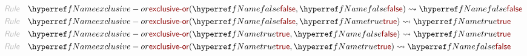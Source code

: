 \begin{align*}
  \KEY{Rule} \quad
    & \NAMEREF{exclusive-or}
        (  \NAMEREF{false}, 
               \NAMEREF{false} ) \leadsto 
        \NAMEREF{false}
\\
  \KEY{Rule} \quad
    & \NAMEREF{exclusive-or}
        (  \NAMEREF{false}, 
               \NAMEREF{true} ) \leadsto 
        \NAMEREF{true}
\\
  \KEY{Rule} \quad
    & \NAMEREF{exclusive-or}
        (  \NAMEREF{true}, 
               \NAMEREF{false} ) \leadsto 
        \NAMEREF{true}
\\
  \KEY{Rule} \quad
    & \NAMEREF{exclusive-or}
        (  \NAMEREF{true}, 
               \NAMEREF{true} ) \leadsto 
        \NAMEREF{false}
\end{align*}


